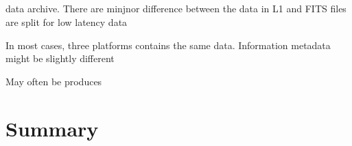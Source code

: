 \documentclass{aa}
\begin{document}
\subsection{}
data archive. 
There are minjnor difference between the data in L1 and 
FITS files are split for low latency data 

In most cases, three platforms contains the same data. 
Information metadata might be slightly different 

May often be produces 

\section{Summary}
\label{sec:summary}



%
%



\end{document}

